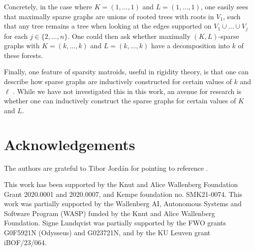 \documentclass{article}
\begin{document}
Concretely, in the case where $K=(1, \dots, 1)$ and $L=(1, \dots, 1)$, one easily sees that maximally sparse graphs are unions of rooted trees with roots in $V_1$, such that any tree remains a tree when looking at the edges supported on $V_1\cup \dots \cup V_j$ for each $j\in \{2, \dots, n\}$. One could then ask whether maximally $(K,L)$-sparse graphs with $K=(k, \dots, k)$ and $L=(k, \dots, k)$ have a decomposition into $k$ of these forests.
    
Finally, one feature of sparsity matroids, useful in rigidity theory, is that one can describe how sparse graphs are inductively constructed for certain values of $k$ and $\ell$ \cite{SZEGO20061211}. While we have not investigated this in this work, an avenue for research is whether one can inductively construct the sparse graphs for certain values of $K$ and $L$.

    
\section*{Acknowledgements}
The authors are grateful to Tibor Jord\'an for pointing to reference \cite{FRANK}. 

This work has been supported by the Knut and Alice Wallenberg Foundation Grant 2020.0001 and 2020.0007, and Kempe foundation no. SMK21-0074. This work was partially supported by the Wallenberg AI, Autonomous Systems and
Software Program (WASP) funded by the Knut and Alice Wallenberg Foundation. Signe Lundqvist was partially supported by the FWO grants G0F5921N (Odysseus) and G023721N, and by the KU Leuven grant iBOF/23/064.



\end{document}
